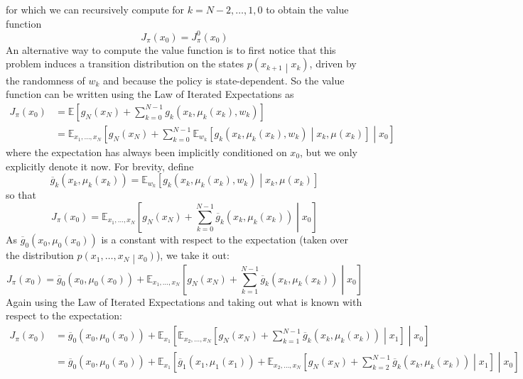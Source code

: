 \documentclass[11pt]{report} %
\begin{document}
for which we can recursively compute for $k = N - 2, \dots, 1, 0$ to obtain the value function
\begin{equation}
J_{\pi}\left(x_{0}\right) = J_{\pi}^{0}\left(x_{0}\right)
\end{equation}
An alternative way to compute the value function is to first notice that this problem induces a transition distribution on the states $p\left(x_{k + 1}\middle|x_{k}\right)$, driven by the randomness of $w_{k}$ and because the policy is state-dependent. So the value function can be written using the Law of Iterated Expectations as
\begin{align}
J_{\pi}\left(x_{0}\right) &= \mathbb{E}\left[g_{N}\left(x_{N}\right)+\sum_{k=0}^{N-1}g_{k}\left(x_{k},\mu_{k}\left(x_{k}\right),w_{k}\right)\right] \\
&= \mathbb{E}_{x_{1},\dots,x_{N}}\left[g_{N}\left(x_{N}\right)+\sum_{k=0}^{N-1}\mathbb{E}_{w_{k}}\left[g_{k}\left(x_{k},\mu_{k}\left(x_{k}\right),w_{k}\right)\middle|x_{k},\mu\left(x_{k}\right)\right]\middle|x_{0}\right]
\end{align}
where the expectation has always been implicitly conditioned on $x_{0}$, but we only explicitly denote it now. For brevity, define
\begin{equation}
\overline{g}_{k}\left(x_{k},\mu_{k}\left(x_{k}\right)\right)=\mathbb{E}_{w_{k}}\left[g_{k}\left(x_{k},\mu_{k}\left(x_{k}\right),w_{k}\right)\middle|x_{k},\mu\left(x_{k}\right)\right]
\end{equation}
so that
\begin{equation}
J_{\pi}\left(x_{0}\right)=\mathbb{E}_{x_{1},\dots,x_{N}}\left[g_{N}\left(x_{N}\right)+\sum_{k=0}^{N-1}\overline{g}_{k}\left(x_{k},\mu_{k}\left(x_{k}\right)\right)\middle|x_{0}\right]
\end{equation}
As $\overline{g}_{0}\left(x_{0},\mu_{0}\left(x_{0}\right)\right)$ is a constant with respect to the expectation (taken over the distribution $p\left(x_{1}, \dots, x_{N}\middle|x_{0}\right)$), we take it out:
\begin{equation}
J_{\pi}\left(x_{0}\right)=\overline{g}_{0}\left(x_{0},\mu_{0}\left(x_{0}\right)\right)+\mathbb{E}_{x_{1},\dots,x_{N}}\left[g_{N}\left(x_{N}\right)+\sum_{k=1}^{N-1}\overline{g}_{k}\left(x_{k},\mu_{k}\left(x_{k}\right)\right)\middle|x_{0}\right]
\end{equation}
Again using the Law of Iterated Expectations and taking out what is known with respect to the expectation:
\begin{align}
J_{\pi}\left(x_{0}\right) &= \overline{g}_{0}\left(x_{0},\mu_{0}\left(x_{0}\right)\right)+\mathbb{E}_{x_{1}}\left[\mathbb{E}_{x_{2},\dots,x_{N}}\left[g_{N}\left(x_{N}\right)+\sum_{k=1}^{N-1}\overline{g}_{k}\left(x_{k},\mu_{k}\left(x_{k}\right)\right)\middle|x_{1}\right]\middle|x_{0}\right] \\
&= \overline{g}_{0}\left(x_{0},\mu_{0}\left(x_{0}\right)\right)+\mathbb{E}_{x_{1}}\left[\overline{g}_{1}\left(x_{1},\mu_{1}\left(x_{1}\right)\right)+\mathbb{E}_{x_{2},\dots,x_{N}}\left[g_{N}\left(x_{N}\right)+\sum_{k=2}^{N-1}\overline{g}_{k}\left(x_{k},\mu_{k}\left(x_{k}\right)\right)\middle|x_{1}\right]\middle|x_{0}\right]
\end{align}
\end{document}

